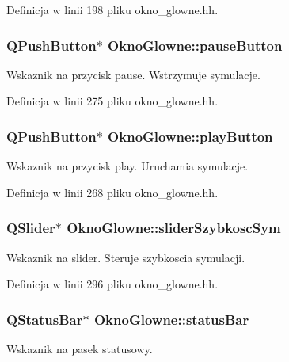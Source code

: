 Definicja w linii 198 pliku okno\-\_\-glowne.\-hh.

\hypertarget{class_okno_glowne_a0dde8df8a49b8f47f17f8e748fd15967}{
\subsubsection[{pause\-Button}]{\setlength{\rightskip}{0pt plus 5cm}Q\-Push\-Button$\ast$ Okno\-Glowne\-::pause\-Button\hspace{0.3cm}{\ttfamily [private]}}}\label{class_okno_glowne_a0dde8df8a49b8f47f17f8e748fd15967}
Wskaznik na przycisk pause. Wstrzymuje symulacje. 

Definicja w linii 275 pliku okno\-\_\-glowne.\-hh.

\hypertarget{class_okno_glowne_a50f936486c1bc3b3278823a8eb90841e}{
\subsubsection[{play\-Button}]{\setlength{\rightskip}{0pt plus 5cm}Q\-Push\-Button$\ast$ Okno\-Glowne\-::play\-Button\hspace{0.3cm}{\ttfamily [private]}}}\label{class_okno_glowne_a50f936486c1bc3b3278823a8eb90841e}
Wskaznik na przycisk play. Uruchamia symulacje. 

Definicja w linii 268 pliku okno\-\_\-glowne.\-hh.

\hypertarget{class_okno_glowne_a85328893065393400d5a0344004ca78b}{
\subsubsection[{slider\-Szybkosc\-Sym}]{\setlength{\rightskip}{0pt plus 5cm}Q\-Slider$\ast$ Okno\-Glowne\-::slider\-Szybkosc\-Sym\hspace{0.3cm}{\ttfamily [private]}}}\label{class_okno_glowne_a85328893065393400d5a0344004ca78b}
Wskaznik na slider. Steruje szybkoscia symulacji. 

Definicja w linii 296 pliku okno\-\_\-glowne.\-hh.

\hypertarget{class_okno_glowne_a40a10989bc6b318ac24e2457d7adb53b}{
\subsubsection[{status\-Bar}]{\setlength{\rightskip}{0pt plus 5cm}Q\-Status\-Bar$\ast$ Okno\-Glowne\-::status\-Bar\hspace{0.3cm}{\ttfamily [private]}}}\label{class_okno_glowne_a40a10989bc6b318ac24e2457d7adb53b}
Wskaznik na pasek statusowy. 

